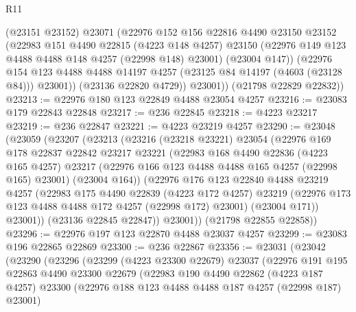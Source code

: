 \begin{lexlean}{R11}
\begin{coremodule}
            (@23151 @23152)
            @23071
            (@22976
              @152
              @156
              @22816
              @4490
              @23150
              @23152
              (@22983
                @151
                @4490
                @22815
                (@4223 @148 @4257)
                @23150
                (@22976 @149 @123 @4488 @4488 @148 @4257 (@22998 @148) @23001)
                (@23004 @147))
              (@22976
                @154
                @123
                @4488
                @4488
                @14197
                @4257
                (@23125 @84 @14197 (@4603 (@23128 @84)))
                @23001))
            (@23136 @22820 @4729))
          @23001))
      (@21798 @22829 @22832))
@23213 := @22976 @180 @123 @22849 @4488 @23054 @4257
@23216 := @23083 @179 @22843 @22848
@23217 := @236 @22845
@23218 := @4223 @23217
@23219 := @236 @22847
@23221 := @4223 @23219 @4257
@23290 := @23048
    (@23059
      (@23207
        (@23213
          (@23216
            (@23218 @23221)
            @23054
            (@22976
              @169
              @178
              @22837
              @22842
              @23217
              @23221
              (@22983
                @168
                @4490
                @22836
                (@4223 @165 @4257)
                @23217
                (@22976 @166 @123 @4488 @4488 @165 @4257 (@22998 @165) @23001)
                (@23004 @164))
              (@22976
                @176
                @123
                @22840
                @4488
                @23219
                @4257
                (@22983
                  @175
                  @4490
                  @22839
                  (@4223 @172 @4257)
                  @23219
                  (@22976 @173 @123 @4488 @4488 @172 @4257 (@22998 @172) @23001)
                  (@23004 @171))
                @23001))
            (@23136 @22845 @22847))
          @23001))
      (@21798 @22855 @22858))
@23296 := @22976 @197 @123 @22870 @4488 @23037 @4257
@23299 := @23083 @196 @22865 @22869
@23300 := @236 @22867
@23356 := @23031
    (@23042
      (@23290
        (@23296
          (@23299
            (@4223 @23300 @22679)
            @23037
            (@22976
              @191
              @195
              @22863
              @4490
              @23300
              @22679
              (@22983
                @190
                @4490
                @22862
                (@4223 @187 @4257)
                @23300
                (@22976 @188 @123 @4488 @4488 @187 @4257 (@22998 @187) @23001)

\end{coremodule}
\end{lexlean}
